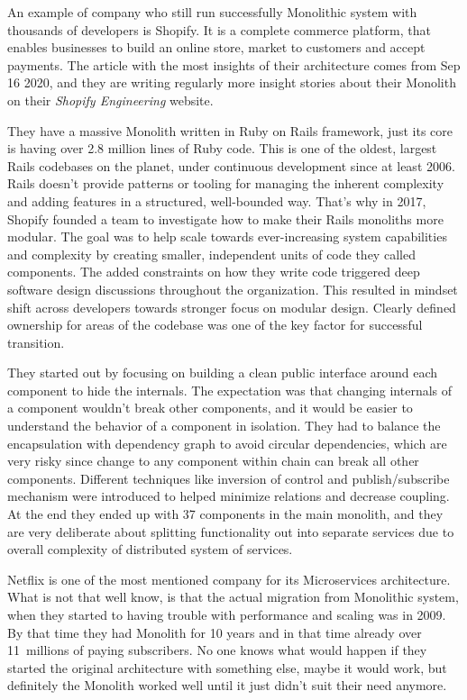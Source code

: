 \begin{example}[Shopify]
    An example of company who still run successfully Monolithic system with thousands of developers is Shopify. It is a complete commerce platform, that enables businesses to build an online store, market to customers and accept payments. The article\cite{SHOPIFY_MONOLITH_ARTICLE} with the most insights of their architecture comes from Sep 16 2020, and they are writing regularly more insight stories about their Monolith on their \textit{Shopify Engineering}\cite{SHOPIFY_ENGINEERING} website.

    They have a massive Monolith written in Ruby on Rails framework, just its core is having over 2.8 million lines of Ruby code. This is one of the oldest, largest Rails codebases on the planet, under continuous development since at least 2006. Rails doesn't provide patterns or tooling for managing the inherent complexity and adding features in a structured, well-bounded way. That's why in 2017, Shopify founded a team to investigate how to make their Rails monoliths more modular. The goal was to help scale towards ever-increasing system capabilities and complexity by creating smaller, independent units of code they called components. The added constraints on how they write code triggered deep software design discussions throughout the organization. This resulted in mindset shift across developers towards stronger focus on modular design. Clearly defined ownership for areas of the codebase was one of the key factor for successful transition. \cite{SHOPIFY_MONOLITH_ARTICLE}

    They started out by focusing on building a clean public interface around each component to hide the internals. The expectation was that changing internals of a component wouldn't break other components, and it would be easier to understand the behavior of a component in isolation. They had to balance the encapsulation with dependency graph to avoid circular dependencies, which are very risky since change to any component within chain can break all other components. Different techniques like inversion of control and publish/subscribe mechanism were introduced to helped minimize relations and decrease coupling. At the end they ended up with 37 components in the main monolith, and they are very deliberate about splitting functionality out into separate services due to overall complexity of distributed system of services. \cite{SHOPIFY_MONOLITH_ARTICLE}
\end{example}

\begin{note*}
    Netflix is one of the most mentioned company for its Microservices architecture. What is not that well know, is that the actual migration from Monolithic system, when they started to having trouble with performance and scaling was in 2009. By that time they had Monolith for 10 years and in that time already over 11~millions \cite{NETFLIX_2009_EARNINGS} of paying subscribers. No one knows what would happen if they started the original architecture with something else, maybe it would work, but definitely the Monolith worked well until it just didn't suit their need anymore.
\end{note*}
